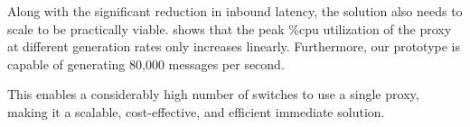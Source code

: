 Along with the significant reduction in inbound latency, the solution also
needs to scale to be practically viable.  shows that the peak \%cpu utilization of the proxy at different \packetin generation rates only increases linearly. Furthermore, our prototype is capable of generating 
80,000 \packetin messages per second.

This enables a considerably high number of switches to use a single proxy,
making it a scalable, cost-effective, and efficient immediate solution.



